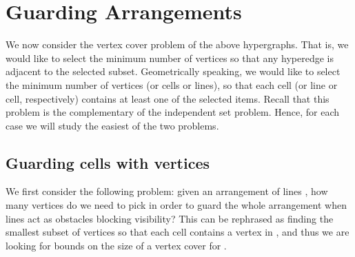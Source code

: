 \documentclass[11pt,a4paper]{article}
\newcommand{\sholong}[2]{#2}
\begin{document}
\section{Guarding Arrangements}\label{sec:guarding}
\sholong{}{We now consider the vertex cover problem of the above hypergraphs. That is, we would like to select the minimum number of vertices so that any hyperedge is adjacent to the selected subset. Geometrically speaking, we would like to select the minimum number of vertices (or cells or lines), so that each cell (or line or cell, respectively) contains at least one of the selected items. Recall that this problem is the complementary of the independent set problem. Hence, for each case we will study the easiest of the two problems.   

}
\subsection{Guarding cells with vertices}

We first consider the following problem: given an arrangement of lines , how many vertices do we need to pick in order to guard the whole arrangement when lines act as obstacles blocking visibility? This can be rephrased as finding the smallest subset of vertices  so that each cell contains a vertex in , and thus we are looking for bounds on the size of a vertex cover for .
\end{document}
